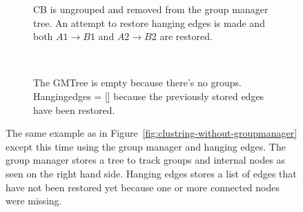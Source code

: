 \begin{figure}[h]
  \begin{subfigure}[t]{0.5\textwidth}
    \centering
    \renewcommand\thesubfigure{E1}
    \caption{CB is ungrouped and removed from the group manager tree. An attempt to restore hanging edges is made and both $A1\rightarrow B1$ and $A2\rightarrow B2$ are restored.}
  \end{subfigure}
  ~
  \begin{subfigure}[t]{0.5\textwidth}
    \centering
    \renewcommand\thesubfigure{E2}
    \caption{The GMTree is empty because there's no groups. Hangingedges = [] because the previously stored edges have been restored.}
  \end{subfigure}
  \caption{The same example as in Figure~\ref{fig:clustring-without-groupmanager} except this time using the group manager and hanging edges. The group manager stores a tree to track groups and internal nodes as seen on the right hand side. Hanging edges stores a list of edges that have not been restored yet because one or more connected nodes were missing.}
	\label{fig:clustring-with-groupmanager}
\end{figure}

\restoregeometry %

